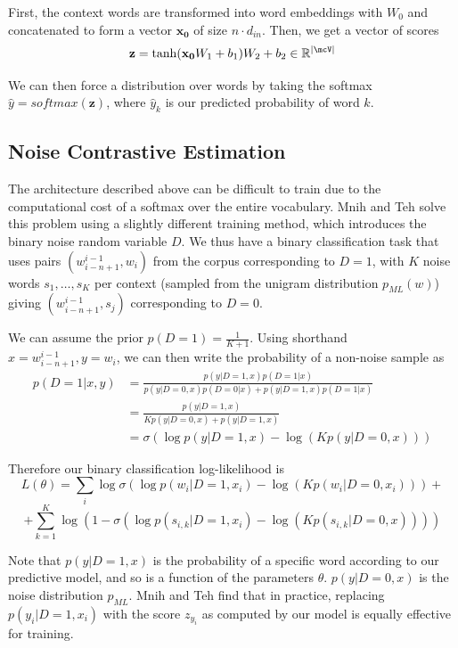\documentclass[11pt]{article}
\begin{document}
First, the context words are transformed into word embeddings with $W_0$ and concatenated to form a vector $ \mathbf{x_0}$ of size $n \cdot  d_{in}$. Then, we get a vector of scores
$$\mathbf{z} = \tanh(\mathbf{x_0}W_1 + b_1)W_2 + b_2 \in \mathbb{R}^{|\mcV|}$$

We can then force a distribution over words by taking the softmax $\widehat{y} = softmax(\mathbf{z})$, where $\widehat{y}_k$ is our predicted probability of word $k$.

\subsection{Noise Contrastive Estimation}

The architecture described above can be difficult to train due to the computational cost of a softmax over the entire vocabulary. Mnih and Teh solve this problem using a slightly different training method, which introduces the binary noise random variable $D$. We thus have a binary classification task that uses pairs $(w_{i-n+1}^{i-1}, w_i)$ from the corpus corresponding to $D = 1$, with $K$ noise words $s_1, \ldots, s_K$ per context (sampled from the unigram distribution $p_{ML}(w)$) giving $(w_{i-n+1}^{i-1}, s_j)$ corresponding to $D = 0$.

We can assume the prior $p(D = 1) = \frac{1}{K+1}$. Using shorthand $x = w_{i-n+1}^{i-1}, y = w_i$, we can then write the probability of a non-noise sample as
\begin{align*}
p(D = 1 | x, y) & = \frac{p(y | D = 1, x)p(D = 1|x)}{p(y | D=0, x)p(D = 0|x) + p(y|D = 1, x)p(D = 1 | x)} \\
& = \frac{p(y | D = 1, x)}{Kp(y | D=0, x) + p(y|D = 1, x)} \\
& = \sigma(\log p(y | D = 1, x) - \log (Kp(y | D = 0, x)))
\end{align*}

Therefore our binary classification log-likelihood is
$$L(\theta) = \sum_i \log \sigma(\log p(w_i | D = 1, x_i) - \log (Kp(w_i | D = 0, x_i))) + $$
$$+\sum_{k=1}^K \log (1 - \sigma(\log p(s_{i,k} | D = 1 , x_i) - \log(Kp(s_{i,k}| D = 0, x))))$$

Note that $p(y | D = 1, x)$ is the probability of a specific word according to our predictive model, and so is a function of the parameters $\theta$. $p(y | D = 0, x)$ is the noise distribution $p_{ML}$. Mnih and Teh find that in practice, replacing $p(y_i | D = 1, x_i)$ with the score $z_{y_i}$ as computed by our model is equally effective for training.
\end{document}
